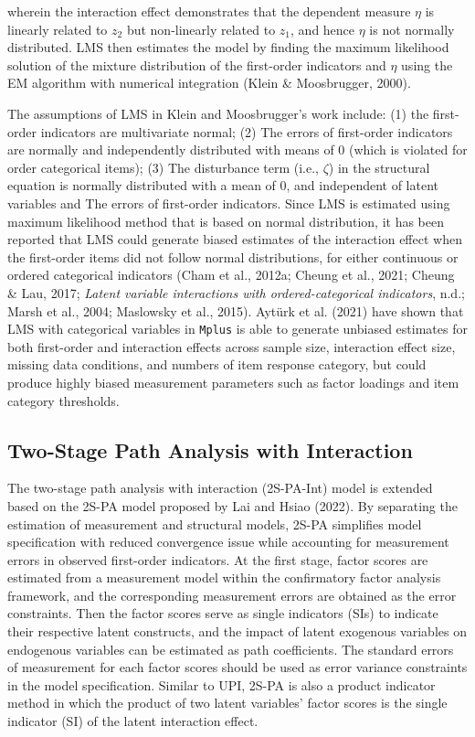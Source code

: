 \documentclass[
  11pt,
  man]{apa6}
\begin{document}
wherein the interaction effect demonstrates that the dependent measure \(\eta\) is linearly related to \(z_{2}\) but non-linearly related to \(z_{1}\), and hence \(\eta\) is not normally distributed. LMS then estimates the model by finding the maximum likelihood solution of the mixture distribution of the first-order indicators and \(\eta\) using the EM algorithm with numerical integration (Klein \& Moosbrugger, 2000).

The assumptions of LMS in Klein and Moosbrugger's work include: (1) the first-order indicators are multivariate normal; (2) The errors of first-order indicators are normally and independently distributed with means of 0 (which is violated for order categorical items); (3) The disturbance term (i.e., \(\zeta\)) in the structural equation is normally distributed with a mean of 0, and independent of latent variables and The errors of first-order indicators. Since LMS is estimated using maximum likelihood method that is based on normal distribution, it has been reported that LMS could generate biased estimates of the interaction effect when the first-order items did not follow normal distributions, for either continuous or ordered categorical indicators (Cham et al., 2012a; Cheung et al., 2021; Cheung \& Lau, 2017; \emph{Latent {variable interactions with ordered-categorical indicators}}, n.d.; Marsh et al., 2004; Maslowsky et al., 2015). Aytürk et al. (2021) have shown that LMS with categorical variables in \texttt{Mplus} is able to generate unbiased estimates for both first-order and interaction effects across sample size, interaction effect size, missing data conditions, and numbers of item response category, but could produce highly biased measurement parameters such as factor loadings and item category thresholds.

\hypertarget{two-stage-path-analysis-with-interaction}{%
\subsection{Two-Stage Path Analysis with Interaction}\label{two-stage-path-analysis-with-interaction}}

The two-stage path analysis with interaction (2S-PA-Int) model is extended based on the 2S-PA model proposed by Lai and Hsiao (2022). By separating the estimation of measurement and structural models, 2S-PA simplifies model specification with reduced convergence issue while accounting for measurement errors in observed first-order indicators. At the first stage, factor scores are estimated from a measurement model within the confirmatory factor analysis framework, and the corresponding measurement errors are obtained as the error constraints. Then the factor scores serve as single indicators (SIs) to indicate their respective latent constructs, and the impact of latent exogenous variables on endogenous variables can be estimated as path coefficients. The standard errors of measurement for each factor scores should be used as error variance constraints in the model specification. Similar to UPI, 2S-PA is also a product indicator method in which the product of two latent variables' factor scores is the single indicator (SI) of the latent interaction effect.
\end{document}
